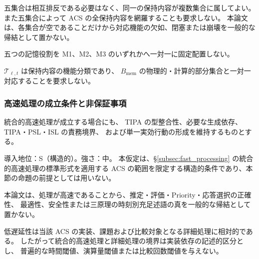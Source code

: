 \begin{remark}
\label{rem:fast_memory_nonexclusive}
五集合は相互排反である必要はなく、同一の保持内容が複数集合に属してよい。
また五集合によって ACS の全保持内容を網羅することも要求しない。
本論文は、各集合が空であることだけから対応機能の欠如、閉塞または崩壊を一般的な帰結として置かない。
\end{remark}

\begin{remark}[五記憶集合とTIPA機構の非固定対応]
\label{rem:fast_memory_no_fixed_mapping}
五つの記憶役割を M1、M2、M3 のいずれかへ一対一に固定配置しない。
\end{remark}

\begin{remark}[五記憶集合とISL記憶実装役割]
\label{rem:fast_memory_isl}
$\mathcal T_{\ell,t}$ は保持内容の機能分類であり、
$B_{\mathrm{mem}}$ の物理的・計算的部分集合と一対一対応することを要求しない。
\end{remark}

\subsubsection{高速処理の成立条件と非保証事項}
\label{subsubsec:fast_conditions}

\begin{assumption}[高速処理時の構造整合条件]
\label{ass:fast_structural_consistency}
統合的高速処理が成立する場合にも、
TIPA の型整合性、必要な生成依存、TIPA・PSL・ISL の責務境界、
および単一実効行動の形成を維持するものとする。

導入地位：S（構造的）。強さ：中。
本仮定は、\S\ref{subsec:fast_processing} の統合的高速処理の標準形式を適用する ACS の範囲を限定する構造的条件であり、本節の命題の前提としては用いない。
\end{assumption}

\begin{remark}[高速性と正確性の区別]
\label{rem:fast_not_accuracy}
本論文は、処理が高速であることから、推定・評価・Priority・応答選択の正確性、
最適性、安全性または三原理の時刻別充足述語の真を一般的な帰結として置かない。
\end{remark}

\begin{remark}[高速性の境界水準を一意に固定しないこと]
\label{rem:fast_boundary_levels}
低遅延性は当該 ACS の実装、課題および比較対象となる詳細処理に相対的である。
したがって統合的高速処理と詳細処理の境界は実装依存の記述的区分とし、
普遍的な時間閾値、演算量閾値または比較回数閾値を与えない。
\end{remark}

